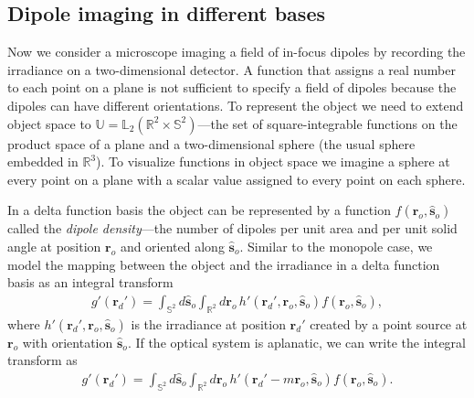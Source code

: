 \documentclass[]{osa-article}
\providecommand{\ro}{\mathbf{\mathbf{r}}_o}
\providecommand{\so}{\mathbf{\hat{s}}_o}
\providecommand{\rd}{\mathbf{r}_d}
\providecommand{\mbb}[1]{\mathbb{#1}}
\begin{document}
\subsection{Dipole imaging in different bases}\label{sec:dipole}
Now we consider a microscope imaging a field of in-focus dipoles by recording
the irradiance on a two-dimensional detector. A function that assigns a real
number to each point on a plane is not sufficient to specify a field of dipoles
because the dipoles can have different orientations. To represent the object we
need to extend object space to
$\mbb{U} = \mbb{L}_2(\mbb{R}^2\times\mbb{S}^2)$---the set of square-integrable
functions on the product space of a plane and a two-dimensional sphere (the
usual sphere embedded in $\mbb{R}^3$). To visualize functions in object space we
imagine a sphere at every point on a plane with a scalar value assigned to every
point on each sphere.

In a delta function basis the object can be represented by a function
$f(\ro, \so)$ called the \textit{dipole density}---the number of dipoles per
unit area and per unit solid angle at position $\ro{}$ and oriented along
$\so{}$. Similar to the monopole case, we model the mapping between the object
and the irradiance in a delta function basis as an integral transform
\begin{align}
  g'(\rd') = \int_{\mbb{S}^2}d\so\int_{\mbb{R}^2}d\ro\, h'(\rd', \ro, \so)f(\ro, \so),
\end{align}
where $h'(\rd', \ro, \so)$ is the irradiance at position $\rd'$ created by a
point source at $\ro$ with orientation $\so$. If the optical system is
aplanatic, we can write the integral transform as
\begin{align}
  g'(\rd') = \int_{\mbb{S}^2}d\so\int_{\mbb{R}^2}d\ro\, h'(\rd' - m\ro, \so)f(\ro, \so). 
\end{align}
\end{document}
